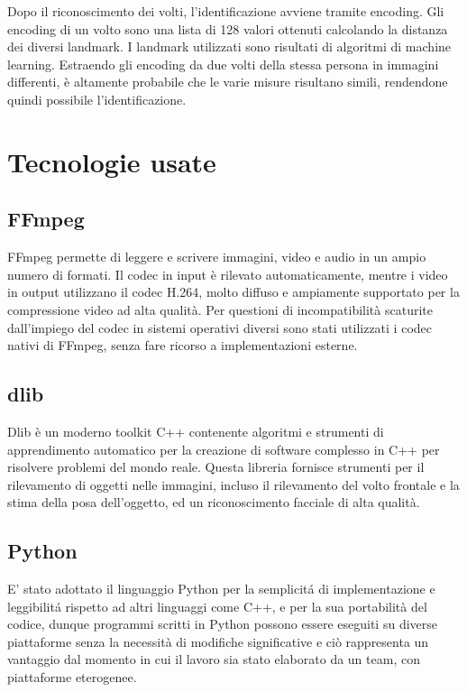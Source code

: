 \documentclass{report}
\begin{document}
Dopo il riconoscimento dei volti, l’identificazione avviene tramite encoding. Gli encoding di un volto sono una lista di 128 valori ottenuti calcolando la distanza dei diversi landmark. I landmark utilizzati sono risultati di algoritmi di machine learning. Estraendo gli encoding da due volti della stessa persona in immagini differenti, è altamente probabile che le varie misure risultano simili, rendendone quindi possibile l’identificazione. \\

\section{Tecnologie usate}
\subsection{FFmpeg}
FFmpeg permette di leggere e scrivere immagini, video e audio in un ampio numero di formati. Il codec in input è rilevato automaticamente, mentre i video in output utilizzano il codec H.264, molto diffuso e ampiamente supportato per la compressione video ad alta qualità. Per questioni di incompatibilità scaturite dall’impiego del codec in sistemi operativi diversi sono stati utilizzati i codec nativi di FFmpeg, senza fare ricorso a implementazioni esterne.

\subsection{dlib}
Dlib è un moderno toolkit C++ contenente algoritmi e strumenti di apprendimento automatico per la creazione di software complesso in C++ per risolvere problemi del mondo reale. Questa libreria fornisce strumenti per il rilevamento di oggetti nelle immagini, incluso il rilevamento del volto frontale e la stima della posa dell’oggetto, ed un riconoscimento facciale di alta qualità.

\subsection{Python}
E’ stato adottato il linguaggio Python per la semplicitá di implementazione e leggibilitá rispetto ad altri linguaggi come C++, e  per la sua portabilità del codice, dunque programmi scritti in Python possono essere eseguiti su diverse piattaforme senza la necessità di modifiche significative e ciò rappresenta un vantaggio dal momento in cui il lavoro sia stato elaborato da un team, con piattaforme eterogenee.
\end{document}
